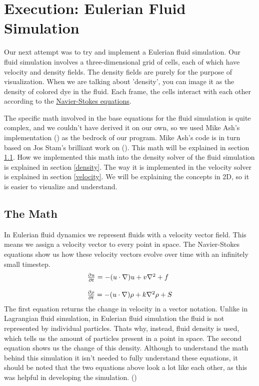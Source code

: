 \documentclass[a4paper,12pt,titlepage]{article}
\begin{document}
\pagebreak
\section{Execution: Eulerian Fluid Simulation}
Our next attempt was to try and implement a Eulerian fluid simulation.
Our fluid simulation involves a three-dimensional grid of cells, each of which
have velocity and density fields. The density fields are purely for the purpose of visualization. When we are talking about 'density',
you can image it as the density of colored dye in the fluid. 
Each frame, the cells interact with each
other according to the \href{https://en.wikipedia.org/wiki/Navier%E2%80%93Stokes_equations}{Navier-Stokes equations}.

The specific math involved in the base equations for the fluid simulation is
quite complex, and we couldn't have derived it on our own, so we used
Mike Ash's implementation \href{www.mikeash.com/pyblog/fluid-simulation-for-dummies.html}{} (\cite{mikeash})
as the bedrock of our program. Mike Ash's code is in turn based on Jos Stam's
brilliant work on \href{www.dgp.toronto.edu/public_user/stam/reality/Research/pdf/GDC03.pdf}{} (\cite{josstam}).
This math will be explained in section \ref{math}. 
How we implemented this math into the density solver of the fluid simulation is explained in section \ref{density}.
The way it is implemented in the velocity solver is explained in section \ref{velocity}.
We will be explaining the concepts in 2D, so it is easier to visualize and understand. 

\subsection{The Math} \label{math}
In Eulerian fluid dynamics we represent fluids with a velocity vector field. This means we assign a velocity vector to every point in space.
The Navier-Stokes equations show us how these velocity vectors evolve over time with an infinitely small timestep.
\[
	\begin{array}{ll}
		\pdv{u}{t} = -(u \cdot \nabla)u + v\nabla^2 + f \\
		\\
		\pdv{\rho}{t} = -(u \cdot \nabla)\rho + k\nabla^2\rho + S
	\end{array}
\]
The first equation returns the change in velocity in a vector notation. 
Unlike in Lagrangian fluid simulation, in Eulerian fluid simulation the fluid is not represented by individual particles. 
Thats why, instead, fluid density is used, which tells us the amount of particles present in a point in space. 
The second equation shows us the change of this density. 
Although to understand the math behind this simulation it isn't needed to fully understand these equations, it should be noted that the two equations above look a lot like each other,
as this was helpful in developing the simulation. (\cite{josstam})
\end{document}
